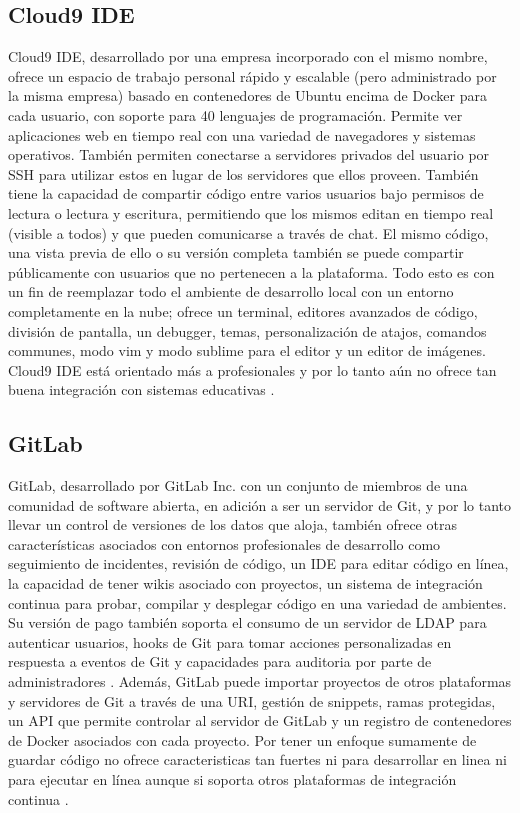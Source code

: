 \subsection{Cloud9 IDE}
Cloud9 IDE, desarrollado por una empresa incorporado con el mismo nombre, ofrece un espacio de trabajo personal rápido y escalable (pero administrado por la misma empresa) basado en contenedores de Ubuntu encima de Docker para cada usuario, con soporte para 40 lenguajes de programación. Permite ver aplicaciones web en tiempo real con una variedad de navegadores y sistemas operativos. También permiten conectarse a servidores privados del usuario por SSH para utilizar estos en lugar de los servidores que ellos proveen. También tiene la capacidad de compartir código entre varios usuarios bajo permisos de lectura o lectura y escritura, permitiendo que los mismos editan en tiempo real (visible a todos) y que pueden comunicarse a través de chat. El mismo código, una vista previa de ello o su versión completa también se puede compartir públicamente con usuarios que no pertenecen a la plataforma. Todo esto es con un fin de reemplazar todo el ambiente de desarrollo local con un entorno completamente en la nube; ofrece un terminal, editores avanzados de código, división de pantalla, un debugger, temas, personalización de atajos, comandos communes, modo vim y modo sublime para el editor y un editor de imágenes. Cloud9 IDE está orientado más a profesionales y por lo tanto aún no ofrece tan buena integración con sistemas educativas \citep{Cloud9-Home}.
 

\subsection{GitLab}
GitLab, desarrollado por GitLab Inc. con un conjunto de miembros de una comunidad de software abierta, en adición a ser un servidor de Git, y por lo tanto llevar un control de versiones de los datos que aloja, también ofrece otras características asociados con entornos profesionales de desarrollo como seguimiento de incidentes, revisión de código, un IDE para editar código en línea, la capacidad de tener wikis asociado con proyectos, un sistema de integración continua para probar, compilar y desplegar código en una variedad de ambientes. Su versión de pago también soporta el consumo de un servidor de LDAP para autenticar usuarios, hooks de Git para tomar acciones personalizadas en respuesta a eventos de Git y capacidades para auditoria por parte de administradores \citep{GitLab}. Además, GitLab puede importar proyectos de otros plataformas y servidores de Git a través de una URI, gestión de snippets, ramas protegidas, un API que permite controlar al servidor de GitLab y un registro de contenedores de Docker asociados con cada proyecto. Por tener un enfoque sumamente de guardar código no ofrece caracteristicas tan fuertes ni para desarrollar en linea ni para ejecutar en línea aunque si soporta otros plataformas de integración continua \citep{GitLab-Features}.

